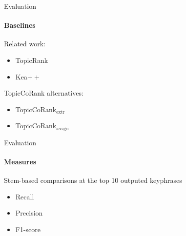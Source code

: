 \begin{frame}{Evaluation}\framesubtitle{Baselines}
  Related work:
  \begin{itemize}
    \item{TopicRank\hfill{}}
    \item{Kea$++$\hfill{}}
  \end{itemize}
  
  \vspace{1em}
  
  TopicCoRank alternatives:
  \begin{itemize}
    \item{TopicCoRank$_{\text{extr}}$\hfill{}}
    \item{TopicCoRank$_{\text{assign}}$\hfill{}}
    \end{itemize}
\end{frame}

\begin{frame}{Evaluation}\framesubtitle{Measures}
  Stem-based comparisons at the top 10 outputed keyphrases
  \begin{itemize}
    \item{Recall}%
    \item{Precision}%
    \item{F1-score}%
  \end{itemize}
\end{frame}

